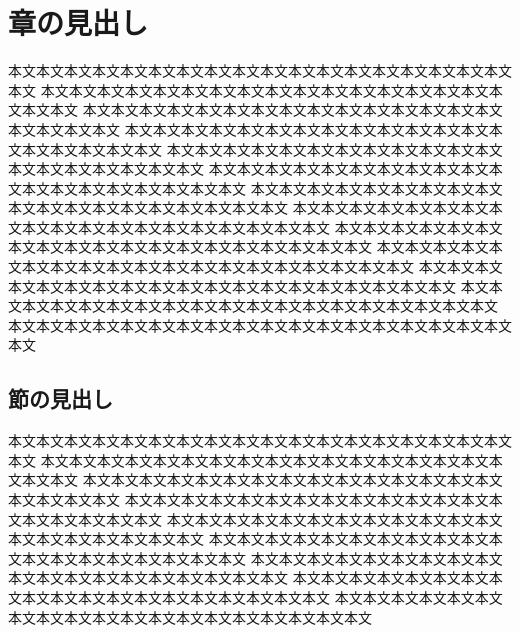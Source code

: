 \documentclass{mta}
\begin{document}
\chapter{章の見出し}
本文本文本文本文本文本文本文本文本文本文本文本文本文本文本文本文本文本文本文
本文本文本文本文本文本文本文本文本文本文本文本文本文本文本文本文本文本文本文
本文本文本文本文本文本文本文本文本文本文本文本文本文本文本文本文本文本文本文
本文本文本文本文本文本文本文本文本文本文本文本文本文本文本文本文本文本文本文
本文本文本文本文本文本文本文本文本文本文本文本文本文本文本文本文本文本文本文
本文本文本文本文本文本文本文本文本文本文本文本文本文本文本文本文本文本文本文
本文本文本文本文本文本文本文本文本文本文本文本文本文本文本文本文本文本文本文
本文本文本文本文本文本文本文本文本文本文本文本文本文本文本文本文本文本文本文
本文本文本文本文本文本文本文本文本文本文本文本文本文本文本文本文本文本文本文
本文本文本文本文本文本文本文本文本文本文本文本文本文本文本文本文本文本文本文
本文本文本文本文本文本文本文本文本文本文本文本文本文本文本文本文本文本文本文
本文本文本文本文本文本文本文本文本文本文本文本文本文本文本文本文本文本文本文
本文本文本文本文本文本文本文本文本文本文本文本文本文本文本文本文本文本文本文

\section{節の見出し}
本文本文本文本文本文本文本文本文本文本文本文本文本文本文本文本文本文本文本文
本文本文本文本文本文本文本文本文本文本文本文本文本文本文本文本文本文本文本文
本文本文本文本文本文本文本文本文本文本文本文本文本文本文本文本文本文本文本文
本文本文本文本文本文本文本文本文本文本文本文本文本文本文本文本文本文本文本文
本文本文本文本文本文本文本文本文本文本文本文本文本文本文本文本文本文本文本文
本文本文本文本文本文本文本文本文本文本文本文本文本文本文本文本文本文本文本文
本文本文本文本文本文本文本文本文本文本文本文本文本文本文本文本文本文本文本文
本文本文本文本文本文本文本文本文本文本文本文本文本文本文本文本文本文本文本文
本文本文本文本文本文本文本文本文本文本文本文本文本文本文本文本文本文本文本文
\end{document}

